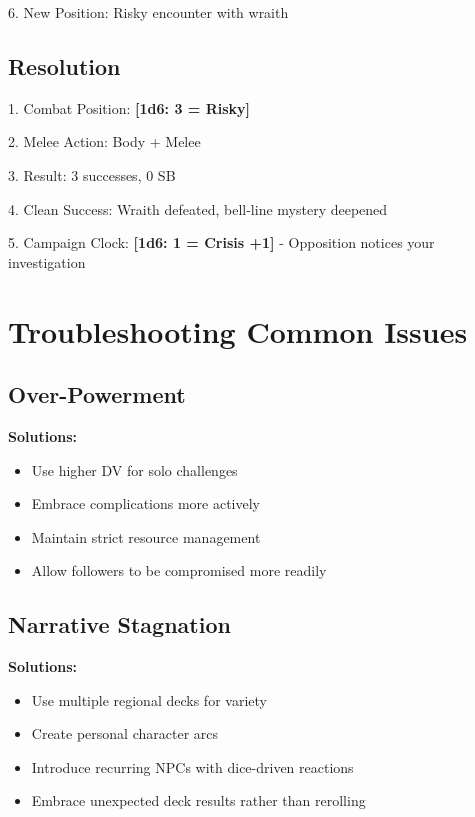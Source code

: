 \documentclass[11pt]{article}
\newcommand{\dice}[1]{\textbf{[1d6: #1]}}
\begin{document}
6. New Position: Risky encounter with wraith

\subsection{Resolution}

1. Combat Position: \dice{3 = Risky}

2. Melee Action: Body + Melee

3. Result: 3 successes, 0 SB

4. Clean Success: Wraith defeated, bell-line mystery deepened

5. Campaign Clock: \dice{1 = Crisis +1} - Opposition notices your investigation

\section{Troubleshooting Common Issues}

\subsection{Over-Powerment}

\begin{framed}
\textbf{Solutions:}
\begin{itemize}
    \item Use higher DV for solo challenges
    \item Embrace complications more actively
    \item Maintain strict resource management
    \item Allow followers to be compromised more readily
\end{itemize}
\end{framed}

\subsection{Narrative Stagnation}

\begin{framed}
\textbf{Solutions:}
\begin{itemize}
    \item Use multiple regional decks for variety
    \item Create personal character arcs
    \item Introduce recurring NPCs with dice-driven reactions
    \item Embrace unexpected deck results rather than rerolling
\end{itemize}
\end{framed}
\end{document}

